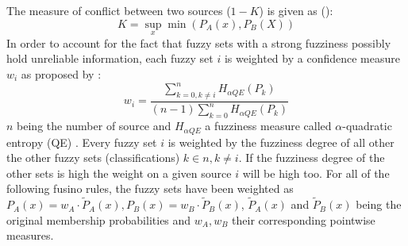 \documentclass[10pt]{article}
\begin{document}
The measure of conflict between two sources ($1-K$) is given as (\cite{ouerghemmi_two-step_2017,dubois_possibility}):
\begin{equation}
    K=\sup_x\min(P_A(x), P_B(X))
\end{equation}
In order to account for the fact that fuzzy sets with a strong fuzziness possibly hold unreliable information, each fuzzy set $i$ is weighted by a confidence measure $w_i$ as proposed by \cite{fauvel_decision_fusion}:
\begin{equation}
    w_i=\frac{\sum_{k=0,k\neq i}^{n}H_{\alpha QE}(P_k)}{(n-1)\sum_{k=0}^{n}H_{\alpha QE}(P_k)}
\end{equation}
$n$ being the number of source and $H_{\alpha QE}$ a fuzziness measure called $\alpha$-quadratic entropy (QE) \parencite{pal_measuring_1994}. Every fuzzy set $i$ is weighted by the fuzziness degree of all other the other fuzzy sets (classifications) $k\in n,k\neq i$. If the fuzziness degree of the other sets is high the weight on a given source $i$ will be high too. For all of the following fusino rules, the fuzzy sets have been weighted as $P_A(x)=w_A\cdot\tilde{P}_A(x), P_B(x)=w_B\cdot\tilde{P}_B(x)$, $\tilde{P}_A(x)$ and $\tilde{P}_B(x)$ being the original membership probabilities and $w_A, w_B$ their corresponding pointwise measures.\\
\end{document}
